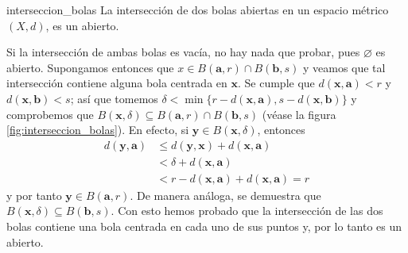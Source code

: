 \begin{lemma}{}{interseccion_bolas}
    La intersección de dos bolas abiertas en un espacio métrico $(X, d)$, es un abierto.

    \tcblower
    \demostracion Si la intersección de ambas bolas es vacía, no hay nada que probar, pues $\varnothing$ es abierto. Supongamos entonces que $x \in B(\mathbf{a}, r) \cap B(\mathbf{b}, s)$ y veamos que tal intersección contiene alguna bola centrada en $\mathbf{x}$. Se cumple que $d(\mathbf{x}, \mathbf{a}) < r$ y $d(\mathbf{x}, \mathbf{b}) < s$; así que tomemos $\delta < \min\{r - d(\mathbf{x}, \mathbf{a}), s - d(\mathbf{x}, \mathbf{b})\}$ y comprobemos que $B(\mathbf{x}, \delta) \subseteq B(\mathbf{a}, r) \cap B(\mathbf{b}, s)$ (véase la figura \ref{fig:interseccion_bolas}). En efecto, si $\mathbf{y} \in B(\mathbf{x}, \delta)$, entonces
    \begin{align*}
        d(\mathbf{y}, \mathbf{a}) & \leq d(\mathbf{y}, \mathbf{x}) + d(\mathbf{x}, \mathbf{a}) \\
        & < \delta + d(\mathbf{x}, \mathbf{a}) \\
        & < r - d(\mathbf{x}, \mathbf{a}) + d(\mathbf{x}, \mathbf{a}) = r
    \end{align*}
    y por tanto $\mathbf{y} \in B(\mathbf{a}, r)$. De manera análoga, se demuestra que $B(\mathbf{x}, \delta) \subseteq B(\mathbf{b}, s)$. Con esto hemos probado que la intersección de las dos bolas contiene una bola centrada en cada uno de sus puntos y, por lo tanto es un abierto.
\end{lemma}

